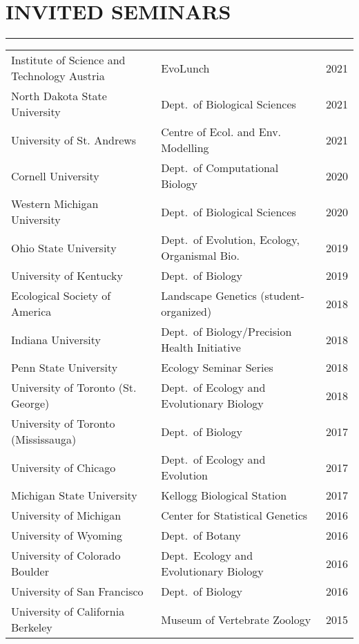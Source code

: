 \documentclass{article}
\begin{document}
\section*{INVITED SEMINARS}
\vspace{-0.6cm}
\rule{470pt}{0.4pt}
%
\begin{longtable}{>{\everypar{\hangindent1cm}}p{}p{}p{}}
%
Institute of Science and Technology Austria & EvoLunch & \hfill 2021 \\
%
North Dakota State University & Dept.\ of Biological Sciences & \hfill 2021 \\
%
University of St. Andrews & Centre of Ecol. and Env. Modelling & \hfill 2021 \\
%
Cornell University & Dept.\ of Computational Biology & \hfill 2020 \\
%
Western Michigan University & Dept.\ of Biological Sciences & \hfill 2020 \\
%
Ohio State University & Dept.\ of Evolution, Ecology, Organismal Bio. & \hfill 2019 \\
%
University of Kentucky & Dept.\ of Biology & \hfill 2019 \\
%
Ecological Society of America & Landscape Genetics (student-organized) & \hfill 2018 \\
%
Indiana University & Dept.\ of Biology/Precision Health Initiative & \hfill 2018 \\
%
Penn State University & Ecology Seminar Series & \hfill 2018 \\
%
University of Toronto (St. George) & Dept.\ of Ecology and Evolutionary Biology & \hfill 2018 \\
%
University of Toronto (Mississauga) & Dept.\ of Biology & \hfill 2017 \\
%
University of Chicago & Dept.\ of Ecology and Evolution & \hfill 2017 \\
%
Michigan State University & Kellogg Biological Station & \hfill 2017 \\
%
University of Michigan & Center for Statistical Genetics & \hfill 2016 \\
%
University of Wyoming & Dept.\ of Botany & \hfill 2016 \\
%
University of Colorado Boulder & Dept.\ Ecology and Evolutionary Biology & \hfill 2016 \\
%
University of San Francisco & Dept.\ of Biology & \hfill 2016 \\
%
University of California Berkeley & Museum of Vertebrate Zoology & \hfill 2015 \\

\end{longtable}
\end{document}
